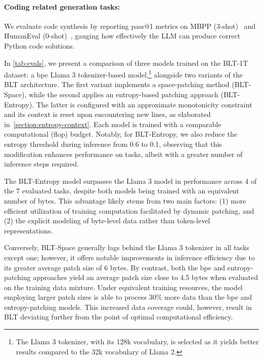 \paragraph{Coding related generation tasks:}  We evaluate code synthesis by reporting pass@1 metrics on MBPP (3-shot)~\citep{Eval_MBPP} and HumanEval (0-shot)~\citep{Eval_HumanEval}, gauging how effectively the LLM can produce correct Python code solutions.

In \autoref{tab:evals}, we present a comparison of three models trained on the {\textsc BLT}-1T dataset: a bpe Llama 3 tokenizer-based model,\footnote{The Llama 3 tokenizer, with its 128k vocabulary, is selected as it yields better results compared to the 32k vocabulary of Llama 2.} alongside two variants of the {\textsc BLT} architecture. The first variant implements a space-patching method ({\textsc BLT}-Space), while the second applies an entropy-based patching approach ({\textsc BLT}-Entropy). The latter is configured with an approximate monotonicity constraint and its context is reset upon encountering new lines, as elaborated in~\autoref{section:entropy-context}. Each model is trained with a comparable computational (flop) budget. Notably, for {\textsc BLT}-Entropy, we also reduce the entropy threshold during inference from 0.6 to 0.1, observing that this modification enhances performance on tasks, albeit with a greater number of inference steps required.

The {\textsc BLT}-Entropy model surpasses the Llama 3 model in performance across 4 of the 7 evaluated tasks, despite both models being trained with an equivalent number of bytes. This advantage likely stems from two main factors: (1) more efficient utilization of training computation facilitated by dynamic patching, and (2) the explicit modeling of byte-level data rather than token-level representations.

Conversely, {\textsc BLT}-Space generally lags behind the Llama 3 tokenizer in all tasks except one; however, it offers notable improvements in inference efficiency due to its greater average patch size of 6 bytes. By contrast, both the bpe and entropy-patching approaches yield an average patch size close to 4.5 bytes when evaluated on the training data mixture. Under equivalent training resources, the model employing larger patch sizes is able to process 30\% more data than the bpe and entropy-patching models. This increased data coverage could, however, result in {\textsc BLT} deviating further from the point of optimal computational efficiency.

